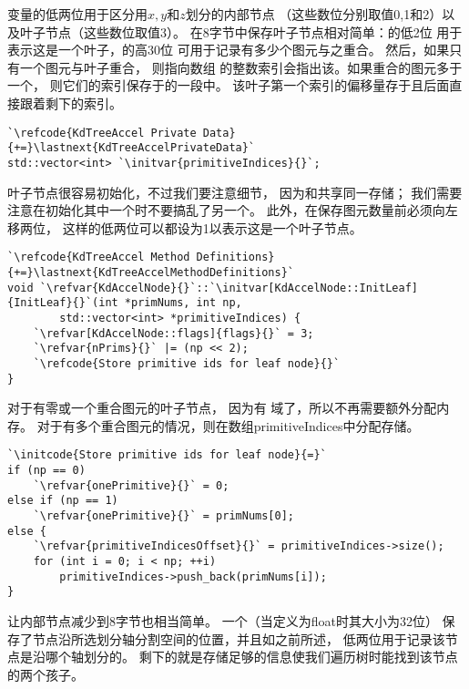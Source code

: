 变量的低两位用于区分用$x,y$和$z$划分的内部节点
（这些数位分别取值0,1和2）以及叶子节点（这些数位取值3）。
在8字节中保存叶子节点相对简单：的低2位
用于表示这是一个叶子，的高30位
可用于记录有多少个图元与之重合。
然后，如果只有一个图元与叶子重合，
则指向数组
的整数索引会指出该。如果重合的图元多于一个，
则它们的索引保存于的一段中。
该叶子第一个索引的偏移量存于且后面直接跟着剩下的索引。
\begin{lstlisting}
`\refcode{KdTreeAccel Private Data}{+=}\lastnext{KdTreeAccelPrivateData}`
std::vector<int> `\initvar{primitiveIndices}{}`;
\end{lstlisting}

叶子节点很容易初始化，不过我们要注意细节，
因为和共享同一存储；
我们需要注意在初始化其中一个时不要搞乱了另一个。
此外，在保存图元数量前必须向左移两位，
这样的低两位可以都设为1以表示这是一个叶子节点。
\begin{lstlisting}
`\refcode{KdTreeAccel Method Definitions}{+=}\lastnext{KdTreeAccelMethodDefinitions}`
void `\refvar{KdAccelNode}{}`::`\initvar[KdAccelNode::InitLeaf]{InitLeaf}{}`(int *primNums, int np,
        std::vector<int> *primitiveIndices) {
    `\refvar[KdAccelNode::flags]{flags}{}` = 3;
    `\refvar{nPrims}{}` |= (np << 2);
    `\refcode{Store primitive ids for leaf node}{}`
}
\end{lstlisting}

对于有零或一个重合图元的叶子节点，
因为有
域了，所以不再需要额外分配内存。
对于有多个重合图元的情况，则在数组{\ttfamily primitiveIndices}中分配存储。
\begin{lstlisting}
`\initcode{Store primitive ids for leaf node}{=}`
if (np == 0)
    `\refvar{onePrimitive}{}` = 0;
else if (np == 1)
    `\refvar{onePrimitive}{}` = primNums[0];
else {
    `\refvar{primitiveIndicesOffset}{}` = primitiveIndices->size();
    for (int i = 0; i < np; ++i)
        primitiveIndices->push_back(primNums[i]);
}
\end{lstlisting}

让内部节点减少到8字节也相当简单。
一个（当定义为{\ttfamily float}时其大小为32位）
保存了节点沿所选划分轴分割空间的位置，并且如之前所述，
低两位用于记录该节点是沿哪个轴划分的。
剩下的就是存储足够的信息使我们遍历树时能找到该节点的两个孩子。

